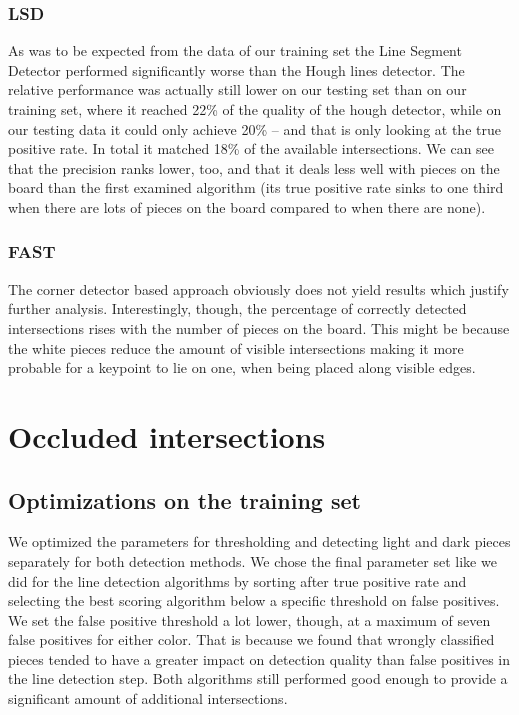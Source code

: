 	\subsubsection{LSD}
	\label{evaluation-visible-performance-lsd}
	As was to be expected from the data of our training set the Line Segment Detector performed significantly worse than the Hough lines detector. The relative performance was actually still lower on our testing set than on our training set, where it reached 22\% of the quality of the hough detector, while on our testing data it could only achieve 20\% -- and that is only looking at the true positive rate. In total it matched 18\% of the available intersections. We can see that the precision ranks lower, too, and that it deals less well with pieces on the board than the first examined algorithm (its true positive rate sinks to one third when there are lots of pieces on the board compared to when there are none).

	\subsubsection{FAST}
	\label{evaluation-visible-performance-fast}
	The corner detector based approach obviously does not yield results which justify further analysis. Interestingly, though, the percentage of correctly detected intersections rises with the number of pieces on the board. This might be because the white pieces reduce the amount of visible intersections making it more probable for a keypoint to lie on one, when being placed along visible edges.

	





	\section{Occluded intersections}
	\label{evaluation-occluded}
	\subsection{Optimizations on the training set}
	\label{evaluation-occluded-optimization}
	We optimized the parameters for thresholding and detecting light and dark pieces separately for both detection methods. We chose the final parameter set like we did for the line detection algorithms by sorting after true positive rate and selecting the best scoring algorithm below a specific threshold on false positives. We set the false positive threshold a lot lower, though, at a maximum of seven false positives for either color. That is because we found that wrongly classified pieces tended to have a greater impact on detection quality than false positives in the line detection step. Both algorithms still performed good enough to provide a significant amount of additional intersections.

